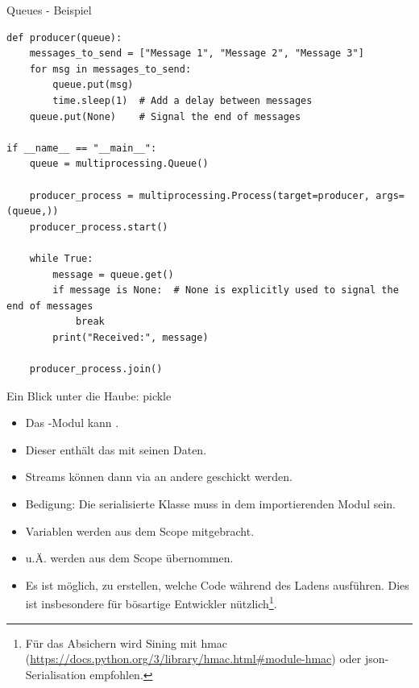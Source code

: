\documentclass[12pt, aspectratio=169, usepdftitle=false]{beamer}
\newcommand{\pp}[1]{\lpl{#1}}
\begin{document}
\begin{frame}[fragile]{Queues - Beispiel}
	\begin{lstlisting}[language=pytiny]
def producer(queue):
    messages_to_send = ["Message 1", "Message 2", "Message 3"]
    for msg in messages_to_send:
        queue.put(msg)
        time.sleep(1)  # Add a delay between messages
    queue.put(None)    # Signal the end of messages

if __name__ == "__main__":
    queue = multiprocessing.Queue()

    producer_process = multiprocessing.Process(target=producer, args=(queue,))
    producer_process.start()

    while True:
        message = queue.get()
        if message is None:  # None is explicitly used to signal the end of messages
            break
        print("Received:", message)

    producer_process.join()
	\end{lstlisting}
\end{frame}

\begin{frame}[fragile]{Ein Blick unter die Haube: pickle}
	\begin{itemize}
		\item Das \pp{pickle}-Modul kann .
		
		\pause
		\item[] Dieser enthält das  mit seinen Daten.
		\pause
		
		\item[] Streams können dann via \pp{Pipe} an andere  geschickt werden.
		
		\pause
		\item Bedigung: Die serialisierte Klasse muss in dem importierenden Modul  sein.
		\item {} Variablen werden aus dem  Scope mitgebracht.
		\item {} u.Ä. werden aus dem  Scope übernommen.
		
		\pause
		
		\item Es ist möglich,  zu erstellen, welche  Code während des Ladens ausführen. Dies ist insbesondere für bösartige Entwickler nützlich\footnote{Für das Absichern wird Sining mit hmac (\url{https://docs.python.org/3/library/hmac.html\#module-hmac}) oder json-Serialisation empfohlen.}.
	\end{itemize}
\end{frame}
\end{document}
